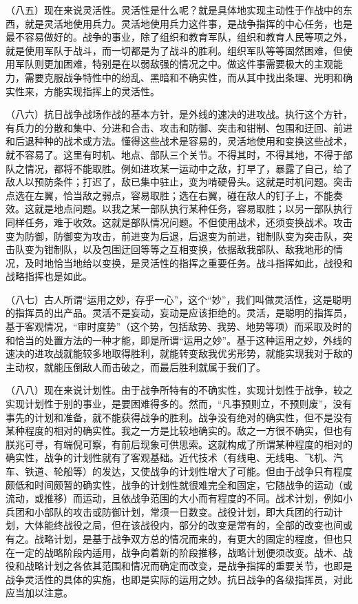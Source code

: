 \documentclass[UTF8, 12pt, a4paper]{ctexrep}
\begin{document}
（八五）现在来说灵活性。灵活性是什么呢？就是具体地实现主动性于作战中的东西，就是灵活地使用兵力。灵活地使用兵力这件事，是战争指挥的中心任务，也是最不容易做好的。战争的事业，除了组织和教育军队，组织和教育人民等项之外，就是使用军队于战斗，而一切都是为了战斗的胜利。组织军队等等固然困难，但使用军队则更加困难，特别是在以弱敌强的情况之中。做这件事需要极大的主观能力，需要克服战争特性中的纷乱、黑暗和不确实性，而从其中找出条理、光明和确实性来，方能实现指挥上的灵活性。

（八六）抗日战争战场作战的基本方针，是外线的速决的进攻战。执行这个方针，有兵力的分散和集中、分进和合击、攻击和防御、突击和钳制、包围和迂回、前进和后退种种的战术或方法。懂得这些战术是容易的，灵活地使用和变换这些战术，就不容易了。这里有时机、地点、部队三个关节。不得其时，不得其地，不得于部队之情况，都将不能取胜。例如进攻某一运动中之敌，打早了，暴露了自己，给了敌人以预防条件；打迟了，敌已集中驻止，变为啃硬骨头。这就是时机问题。突击点选在左翼，恰当敌之弱点，容易取胜；选在右翼，碰在敌人的钉子上，不能奏效。这就是地点问题。以我之某一部队执行某种任务，容易取胜；以另一部队执行同样任务，难于收效。这就是部队情况问题。不但使用战术，还须变换战术。攻击变为防御，防御变为攻击，前进变为后退，后退变为前进，钳制队变为突击队，突击队变为钳制队，以及包围迂回等等之互相变换，依据敌我部队、敌我地形的情况，及时地恰当地给以变换，是灵活性的指挥之重要任务。战斗指挥如此，战役和战略指挥也是如此。

（八七）古人所谓“运用之妙，存乎一心”，这个“妙”，我们叫做灵活性，这是聪明的指挥员的出产品。灵活不是妄动，妄动是应该拒绝的。灵活，是聪明的指挥员，基于客观情况，“审时度势”（这个势，包括敌势、我势、地势等项）而采取及时的和恰当的处置方法的一种才能，即是所谓“运用之妙”。基于这种运用之妙，外线的速决的进攻战就能较多地取得胜利，就能转变敌我优劣形势，就能实现我对于敌的主动权，就能压倒敌人而击破之，而最后胜利就属于我们了。

（八八）现在来说计划性。由于战争所特有的不确实性，实现计划性于战争，较之实现计划性于别的事业，是要困难得多的。然而，“凡事预则立，不预则废”，没有事先的计划和准备，就不能获得战争的胜利。战争没有绝对的确实性，但不是没有某种程度的相对的确实性。我之一方是比较地确实的。敌之一方很不确实，但也有朕兆可寻，有端倪可察，有前后现象可供思索。这就构成了所谓某种程度的相对的确实性，战争的计划性就有了客观基础。近代技术（有线电、无线电、飞机、汽车、铁道、轮船等）的发达，又使战争的计划性增大了可能。但由于战争只有程度颇低和时间颇暂的确实性，战争的计划性就很难完全和固定，它随战争的运动（或流动，或推移）而运动，且依战争范围的大小而有程度的不同。战术计划，例如小兵团和小部队的攻击或防御计划，常须一日数变。战役计划，即大兵团的行动计划，大体能终战役之局，但在该战役内，部分的改变是常有的，全部的改变也间或有之。战略计划，是基于战争双方总的情况而来的，有更大的固定的程度，但也只在一定的战略阶段内适用，战争向着新的阶段推移，战略计划便须改变。战术、战役和战略计划之各依其范围和情况而确定而改变，是战争指挥的重要关节，也即是战争灵活性的具体的实施，也即是实际的运用之妙。抗日战争的各级指挥员，对此应当加以注意。
\end{document}
